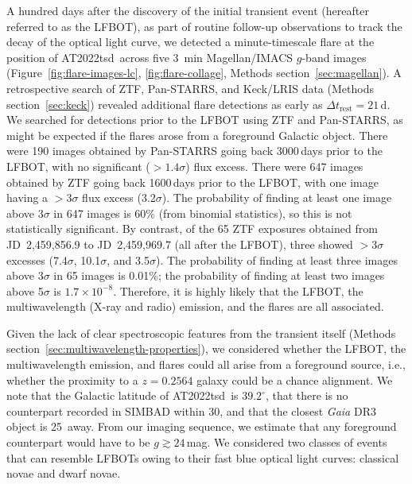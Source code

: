 \documentclass{nature_plusfigure}
\newcommand{\at}{AT2022tsd}
\begin{document}
\begin{methods}
A hundred days after the discovery of the initial transient event (hereafter referred to as the LFBOT), as part of routine follow-up observations to track the decay of the optical light curve, we detected\cite{Ho2022_Astronote_Flares} a minute-timescale flare at the position of \at\ across five 3~min Magellan/IMACS $g$-band images (Figure~\ref{fig:flare-images-lc}, \ref{fig:flare-collage}, Methods section~\ref{sec:magellan}). A retrospective search of ZTF, Pan-STARRS, and Keck/LRIS data (Methods section~\ref{sec:keck}) revealed additional flare detections as early as $\Delta t_\mathrm{rest}=21\,$d. We searched for detections prior to the LFBOT using ZTF and Pan-STARRS, as might be expected if the flares arose from a foreground Galactic object. There were 190 images obtained by Pan-STARRS going back 3000\,days prior to the LFBOT, with no significant ($>1.4\sigma$) flux excess\cite{Fulton2022}. There were 647 images obtained by ZTF going back 1600\,days prior to the LFBOT, with one image having a $>3\sigma$ flux excess (3.2$\sigma$). The probability of finding at least one image above 3$\sigma$ in 647 images is 60\% (from binomial statistics), so this is not statistically significant. By contrast, of the 65 ZTF exposures obtained from JD~2,459,856.9 to JD~2,459,969.7 (all after the LFBOT), three showed $>3\sigma$ excesses (7.4$\sigma$, 10.1$\sigma$, and 3.5$\sigma$). The probability of finding at least three images above 3$\sigma$ in 65 images is 0.01\%; the probability of finding at least two images above 5$\sigma$ is $1.7\times10^{-8}$. Therefore, it is highly likely that the LFBOT, the multiwavelength (X-ray and radio) emission, and the flares are all associated. 


Given the lack of clear spectroscopic features from the transient itself (Methods section~\ref{sec:multiwavelength-properties}), we considered whether the LFBOT, the multiwavelength emission, and flares could all arise from a foreground source, i.e., whether the proximity to a $z=0.2564$ galaxy could be a chance alignment. 
We note that the Galactic latitude of \at\ is $39.2^\circ$, that there is no counterpart recorded in SIMBAD within 30\arcsec, and that the closest {\it Gaia} DR3 object is 25\arcsec\ away. From our imaging sequence, we estimate that any foreground counterpart would have to be $g \gtrsim 24\,$mag. We considered two classes of events that can resemble LFBOTs owing to their fast blue optical light curves: classical novae and dwarf novae.


\end{methods}
\end{document}
